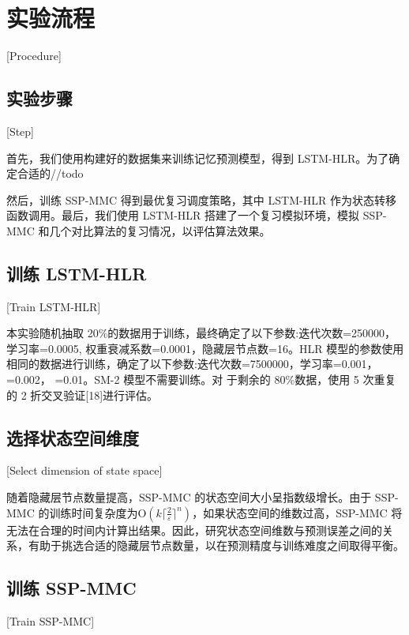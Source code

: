 \section{实验流程}[Procedure]

\subsection{实验步骤}[Step]

首先，我们使用构建好的数据集来训练记忆预测模型，得到 LSTM-HLR。为了确定合适的//todo

然后，训练 SSP-MMC 得到最优复习调度策略，其中 LSTM-HLR 作为状态转移函数调用。最后，我们使用 LSTM-HLR 搭建了一个复习模拟环境，模拟 SSP-MMC 和几个对比算法的复习情况，以评估算法效果。

\subsection{训练 LSTM-HLR}[Train LSTM-HLR]

本实验随机抽取 20\%的数据用于训练，最终确定了以下参数:迭代次数=250000，学习率=0.0005, 权重衰减系数=0.0001，隐藏层节点数=16。HLR 模型的参数使用相同的数据进行训练，确定了以下参数:迭代次数=7500000，学习率=0.001， =0.002， =0.01。SM-2 模型不需要训练。对 于剩余的 80\%数据，使用 5 次重复的 2 折交叉验证[18]进行评估。

\subsection{选择状态空间维度}[Select dimension of state space]

随着隐藏层节点数量提高，SSP-MMC 的状态空间大小呈指数级增长。由于 SSP-MMC 的训练时间复杂度为$\mathrm O(k\lceil\frac{2}{\varepsilon}\rceil^n)$，如果状态空间的维数过高，SSP-MMC 将无法在合理的时间内计算出结果。因此，研究状态空间维数与预测误差之间的关系，有助于挑选合适的隐藏层节点数量，以在预测精度与训练难度之间取得平衡。

\subsection{训练 SSP-MMC}[Train SSP-MMC]

